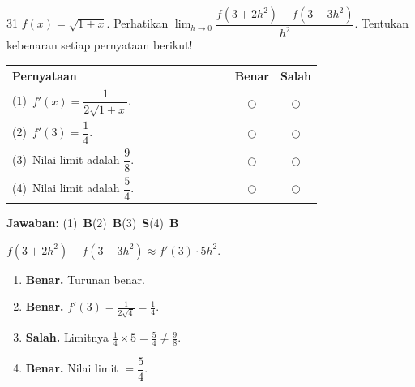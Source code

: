 \documentclass[11pt]{article}
\newcommand{\jawaban}[1]{%
  \noindent\colorbox{gold!30}{\parbox{\dimexpr\linewidth-2\fboxsep\relax}{%
    \textbf{Jawaban:} #1}}\par\smallskip}
\begin{document}
\begin{soal}{31}
$f(x)=\sqrt{1+x}$. Perhatikan $\displaystyle\lim_{h\to0}\dfrac{f(3+2h^2)-f(3-3h^2)}{h^2}$.
Tentukan kebenaran setiap pernyataan berikut!

\par\smallskip
{\renewcommand{\arraystretch}{1.4}%
\begin{tabular}{@{}p{0.76\linewidth}cc@{}}
\hline\textbf{Pernyataan}&\textbf{Benar}&\textbf{Salah}\\\hline
(1)~$f'(x)=\dfrac{1}{2\sqrt{1+x}}$.&$\bigcirc$&$\bigcirc$\\
(2)~$f'(3)=\dfrac{1}{4}$.&$\bigcirc$&$\bigcirc$\\
(3)~Nilai limit adalah $\dfrac{9}{8}$.&$\bigcirc$&$\bigcirc$\\
(4)~Nilai limit adalah $\dfrac{5}{4}$.&$\bigcirc$&$\bigcirc$\\\hline
\end{tabular}}
\end{soal}
\begin{pembox}
\jawaban{(1)~\textbf{B}\quad(2)~\textbf{B}\quad(3)~\textbf{S}\quad(4)~\textbf{B}}
$f(3+2h^2)-f(3-3h^2)\approx f'(3)\cdot5h^2$.
\begin{enumerate}[leftmargin=*,topsep=2pt,itemsep=2pt]
\item \textbf{Benar.} Turunan benar.
\item \textbf{Benar.} $f'(3)=\tfrac{1}{2\sqrt4}=\tfrac14$.
\item \textbf{Salah.} Limitnya $\tfrac14\times5=\tfrac54\neq\tfrac98$.
\item \textbf{Benar.} Nilai limit $=\dfrac{5}{4}$.
\end{enumerate}
\end{pembox}
\end{document}
